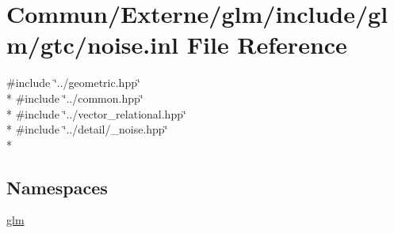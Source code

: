 \hypertarget{noise_8inl}{}\section{Commun/\+Externe/glm/include/glm/gtc/noise.inl File Reference}
\label{noise_8inl}
{\ttfamily \#include \char`\"{}../geometric.\+hpp\char`\"{}}\\*
{\ttfamily \#include \char`\"{}../common.\+hpp\char`\"{}}\\*
{\ttfamily \#include \char`\"{}../vector\+\_\+relational.\+hpp\char`\"{}}\\*
{\ttfamily \#include \char`\"{}../detail/\+\_\+noise.\+hpp\char`\"{}}\\*
\subsection*{Namespaces}
\begin{DoxyCompactItemize}
\item 
 \hyperlink{namespaceglm}{glm}
\end{DoxyCompactItemize}
